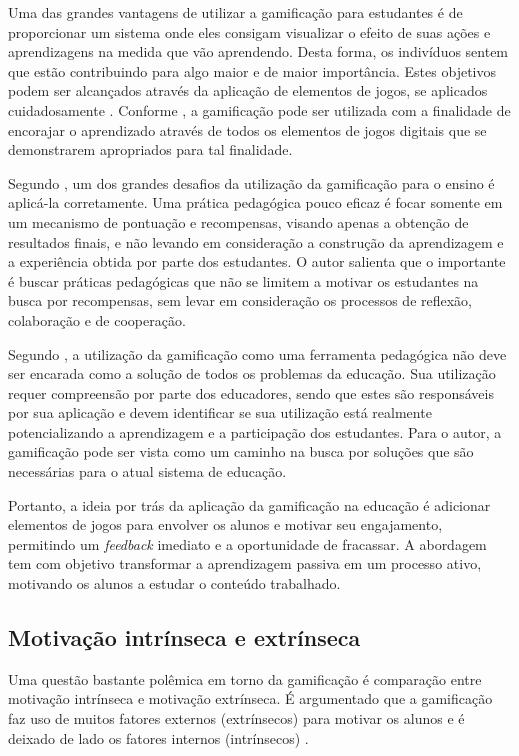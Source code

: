 \documentclass[
	12pt,				%
	oneside,			%
	a4paper,			%
	english,			%
	french,				%
	spanish,			%
	brazil,				%
	]{abntex2}
\begin{document}
Uma das grandes vantagens de utilizar a gamificação para estudantes é de proporcionar um sistema onde eles consigam visualizar o efeito de suas ações e aprendizagens na medida que vão aprendendo. Desta forma, os indivíduos sentem que estão contribuindo para algo maior e de maior importância. Estes objetivos podem ser alcançados através da aplicação de elementos de jogos, se aplicados cuidadosamente \cite{fardo2013gamificaccao}. Conforme \citet{kaap:2014}, a gamificação pode ser utilizada com a finalidade de encorajar o aprendizado através de todos os elementos de jogos digitais que se demonstrarem apropriados para tal finalidade.  

Segundo \citet{fardo2013gamificaccao}, um dos grandes desafios da utilização da gamificação para o ensino é aplicá-la corretamente. Uma prática pedagógica pouco eficaz é focar somente em um mecanismo de pontuação e recompensas, visando apenas a obtenção de resultados finais, e não levando em consideração a construção da aprendizagem e a experiência obtida por parte dos estudantes. O autor salienta que o importante é buscar práticas pedagógicas que não se limitem a motivar os estudantes na busca por recompensas, sem levar em consideração os processos de reflexão, colaboração e de cooperação.

Segundo \citet{fardo2013gamificaccao}, a utilização da gamificação como uma ferramenta pedagógica não deve ser encarada como a solução de todos os problemas da educação. Sua utilização requer compreensão por parte dos educadores, sendo que estes são responsáveis por sua aplicação e devem identificar se sua utilização está realmente potencializando a aprendizagem e a participação dos estudantes. Para o autor, a gamificação pode ser vista como um caminho na busca por soluções que são necessárias para o atual sistema de educação.

Portanto, a ideia por trás da aplicação da gamificação na educação é adicionar elementos de jogos para envolver os alunos e motivar seu engajamento, permitindo um \textit{feedback} imediato e a oportunidade de fracassar. A abordagem tem com objetivo transformar a aprendizagem passiva em um processo ativo, motivando os alunos a estudar o conteúdo trabalhado.

\subsection{Motivação intrínseca e extrínseca}

Uma questão bastante polêmica em torno da gamificação é comparação entre motivação intrínseca e motivação extrínseca. É argumentado que a gamificação faz uso de muitos fatores externos (extrínsecos) para motivar os alunos e é deixado de lado os fatores internos (intrínsecos) \cite{fardo2013gamificaccao}.
\end{document}
